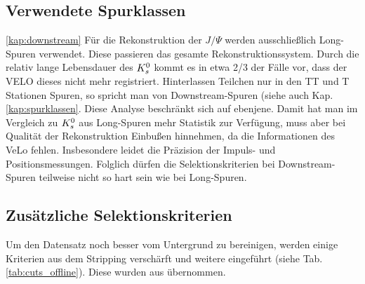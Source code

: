 \subsection{Verwendete Spurklassen} \ref{kap:downstream}
Für die Rekonstruktion der $J/\Psi$ werden ausschließlich \glqq Long\grqq-Spuren verwendet. Diese passieren das gesamte Rekonstruktionssystem. Durch die relativ lange Lebensdauer des $K_s^0$ kommt es in etwa 2/3 der Fälle vor, dass der VELO dieses nicht mehr registriert. Hinterlassen Teilchen nur in den TT und T Stationen Spuren, so spricht man von \glqq Downstream\grqq-Spuren (siehe auch Kap. \ref{kap:spurklassen}. Diese Analyse beschränkt sich auf ebenjene. Damit hat man im Vergleich zu $K_s^0$ aus Long-Spuren mehr Statistik zur Verfügung, muss aber bei Qualität der Rekonstruktion Einbußen hinnehmen, da die Informationen des VeLo fehlen. Insbesondere leidet die Präzision der Impuls- und Positionsmessungen. Folglich dürfen die Selektionskriterien bei Downstream-Spuren teilweise nicht so hart sein wie bei Long-Spuren. \cite{lhcp-paper}

\subsection{Zusätzliche Selektionskriterien}
Um den Datensatz noch besser vom Untergrund zu bereinigen, werden einige Kriterien aus dem Stripping verschärft und weitere eingeführt (siehe Tab. \ref{tab:cuts_offline}). Diese wurden aus \cite{lhcb-paper} übernommen.

